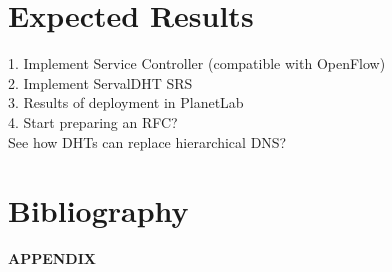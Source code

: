 \documentclass[12pt,a4paper,oneside]{article}
\begin{document}
\newpage
\section{Expected Results}
1. Implement Service Controller (compatible with OpenFlow)
\\2. Implement ServalDHT SRS
\\3. Results of deployment in PlanetLab
\\4. Start preparing an RFC?
\\See how DHTs can replace hierarchical DNS?


\newpage
\section{Bibliography}
\nocite{*}

\renewcommand{\refname}{}



\newpage
\thispagestyle{empty}
{\Huge \bf APPENDIX}
\newpage
\end{document}
